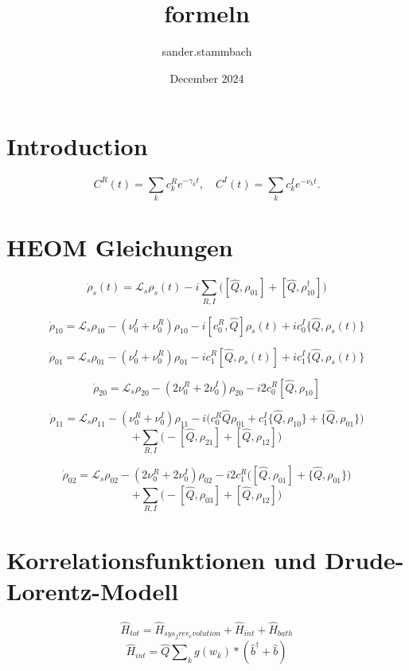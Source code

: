 \documentclass{article}
\title{formeln}
\author{sander.stammbach }
\date{December 2024}
\begin{document}
\pagecolor{white}   %
\color{black} 
\maketitle

\section{Introduction}
\[
C^R(t) = \sum_k c_k^R e^{-\gamma_k t}, \quad C^I(t) = \sum_k c_k^I e^{-\nu_k t}.
\]

\section*{HEOM Gleichungen}

\[
\dot{\rho}_s(t) = \mathcal{L}_s \rho_s(t) - i \sum_{R,I} \Big([\hat{Q}, \rho_{01}] + [\hat{Q}, \rho_{10}^\dagger] \Big)
\]

\[
\dot{\rho}_{10} = \mathcal{L}_s \rho_{10} - (\nu_0^I + \nu_0^R) \rho_{10} - i [c_0^R, \hat{Q}] \rho_s(t) + i c_0^I \{ \hat{Q},\rho_s(t)\}
\]

\[
\dot{\rho}_{01} = \mathcal{L}_s \rho_{01} - (\nu_0^I + \nu_0^R) \rho_{01} - i c_1^R [\hat{Q},\rho_s(t)] + i c_1^I \{ \hat{Q},\rho_s(t)\}
\]

\[
\dot{\rho}_{20} = \mathcal{L}_s \rho_{20} - (2 \nu_0^R + 2 \nu_0^I) \rho_{20} - i 2 c_0^R [\hat{Q}, \rho_{10}]
\]

\[
\dot{\rho}_{11} = \mathcal{L}_s \rho_{11} - (\nu_0^R + \nu_0^I) \rho_{11} - i \Big(c_0^R \hat{Q} \rho_{01} + c_1^I \{ \hat{Q}, \rho_{10} \} + \{ \hat{Q}, \rho_{01} \}\Big)
\]
\[
+ \sum_{R,I} \Big( - [\hat{Q}, \rho_{21}] + [\hat{Q}, \rho_{12}] \Big)
\]

\[
\dot{\rho}_{02} = \mathcal{L}_s \rho_{02} - (2 \nu_0^R + 2 \nu_0^I) \rho_{02} - i 2 c_1^R \Big([\hat{Q}, \rho_{01}] + \{\hat{Q}, \rho_{01}\} \Big)
\]
\[
+ \sum_{R,I} \Big( - [\hat{Q}, \rho_{03}] + [\hat{Q}, \rho_{12}] \Big)
\]


\section*{Korrelationsfunktionen und Drude-Lorentz-Modell}
\begin{equation}
    \hat{H}_{tot}=\hat{H}_{sys_free_evolution}+\hat{H}_{int}+\hat{H}_{bath}
\end{equation}
\begin{equation}
    \hat{H}_{int}=\hat{Q}\dot \sum_k g(w_k)* (\hat{b}^{\dagger}+\hat{b})
\end{equation}
\end{document}

